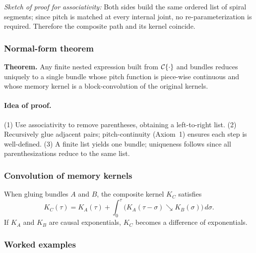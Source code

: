 \noindent\emph{Sketch of proof for associativity:}
Both sides build the same ordered list of spiral segments; since pitch is matched at every internal joint, no re-parameterization is required. Therefore the composite path and its kernel coincide.

\subsubsection{Normal-form theorem}

\textbf{Theorem.}
Any finite nested expression built from \(\mathcal{C}\{\cdot\}\) and bundles reduces uniquely to a single bundle whose pitch function is piece-wise continuous and whose memory kernel is a block-convolution of the original kernels.

\paragraph{Idea of proof.}
(1) Use associativity to remove parentheses, obtaining a left-to-right list. (2) Recursively glue adjacent pairs; pitch-continuity (Axiom~1) ensures each step is well-defined. (3) A finite list yields one bundle; uniqueness follows since all parenthesizations reduce to the same list.

\subsubsection{Convolution of memory kernels}

When gluing bundles \(A\) and \(B\), the composite kernel \(K_C\) satisfies
\[
  K_C(\tau)
  = K_A(\tau)
    + \int_{0}^{\tau}
      \bigl(K_A(\tau - \sigma)\searrow K_B(\sigma)\bigr)\,d\sigma.
\]
If \(K_A\) and \(K_B\) are causal exponentials, \(K_C\) becomes a difference of exponentials.

\subsubsection{Worked examples}


